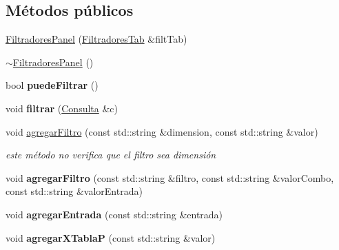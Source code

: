 \subsection*{\-Métodos públicos}
\begin{DoxyCompactItemize}
\item 
\hyperlink{classFiltradoresPanel_adb3759f9adfd87c8f784ec2733ff22f4}{\-Filtradores\-Panel} (\hyperlink{classFiltradoresTab}{\-Filtradores\-Tab} \&filt\-Tab)
\item 
\hyperlink{classFiltradoresPanel_a8c6641e68a9fba171b0d93f5e383e2c7}{$\sim$\-Filtradores\-Panel} ()
\item 
\hypertarget{classFiltradoresPanel_ac557ec32085b68c5c9a618411cf57b32}{bool {\bfseries puede\-Filtrar} ()}\label{classFiltradoresPanel_ac557ec32085b68c5c9a618411cf57b32}

\item 
\hypertarget{classFiltradoresPanel_a472ba816f43c83059e382a1972d26241}{void {\bfseries filtrar} (\hyperlink{classConsulta}{\-Consulta} \&c)}\label{classFiltradoresPanel_a472ba816f43c83059e382a1972d26241}

\item 
\hypertarget{classFiltradoresPanel_ace569cbd25135b114493adba3c899dce}{void \hyperlink{classFiltradoresPanel_ace569cbd25135b114493adba3c899dce}{agregar\-Filtro} (const std\-::string \&dimension, const std\-::string \&valor)}\label{classFiltradoresPanel_ace569cbd25135b114493adba3c899dce}

\begin{DoxyCompactList}\small\item\em este método no verifica que el filtro sea dimensión \end{DoxyCompactList}\item 
\hypertarget{classFiltradoresPanel_a3104a1deb1ecddb9a994843ac3608c2a}{void {\bfseries agregar\-Filtro} (const std\-::string \&filtro, const std\-::string \&valor\-Combo, const std\-::string \&valor\-Entrada)}\label{classFiltradoresPanel_a3104a1deb1ecddb9a994843ac3608c2a}

\item 
\hypertarget{classFiltradoresPanel_a52958ba84e6f4efc5d38c3aece3aa9e0}{void {\bfseries agregar\-Entrada} (const std\-::string \&entrada)}\label{classFiltradoresPanel_a52958ba84e6f4efc5d38c3aece3aa9e0}

\item 
\hypertarget{classFiltradoresPanel_ae849890d22b0d32762b27fc4af325f52}{void {\bfseries agregar\-X\-Tabla\-P} (const std\-::string \&valor)}\label{classFiltradoresPanel_ae849890d22b0d32762b27fc4af325f52}


\end{DoxyCompactItemize}

